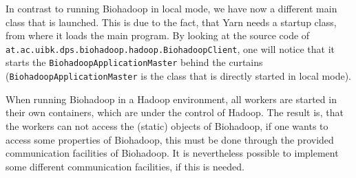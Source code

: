 In contrast to running Biohadoop in local mode, we have now a different main class that is launched. This is due to the fact, that Yarn needs a startup class, from where it loads the main program. By looking at the source code of \texttt{at.ac.uibk.dps.biohadoop.hadoop.BiohadoopClient}, one will notice that it starts the \texttt{BiohadoopApplicationMaster} behind the curtains (\texttt{BiohadoopApplicationMaster} is the class that is directly started in local mode).

When running Biohadoop in a Hadoop environment, all workers are started in their own containers, which are under the control of Hadoop. The result is, that the workers can not access the (static) objects of Biohadoop, if one wants to access some properties of Biohadoop, this must be done through the provided communication facilities of Biohadoop. It is nevertheless possible to implement some different communication facilities, if this is needed.

% 

% 
% 
% 

